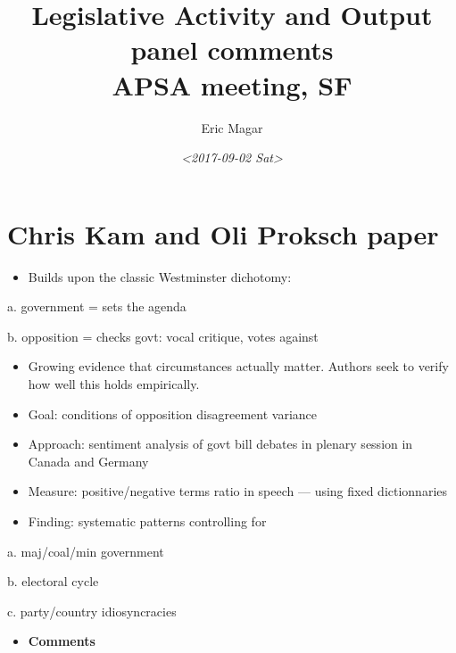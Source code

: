 \documentclass{article}
\author{Eric Magar}
\date{\textit{<2017-09-02 Sat>}}
\title{Legislative Activity and Output panel comments\\\medskip
\large APSA meeting, SF}
\begin{document}
\maketitle

\section{Chris Kam and Oli Proksch paper}
\label{sec:orga8dba22}

\begin{itemize}
\item Builds upon the classic Westminster dichotomy:
\end{itemize}

a. government = sets the agenda

b. opposition = checks govt: vocal critique, votes against

\begin{itemize}
\item Growing evidence that circumstances actually matter. Authors seek to verify how well this holds empirically.

\item Goal: conditions of opposition disagreement variance

\item Approach: sentiment analysis of govt bill debates in plenary session in Canada and Germany

\item Measure: positive/negative terms ratio in speech --- using fixed dictionnaries

\item Finding: systematic patterns controlling for
\end{itemize}

a. maj/coal/min government

b. electoral cycle

c. party/country idiosyncracies

\begin{itemize}
\item \textbf{Comments}
\end{itemize}
\end{document}
